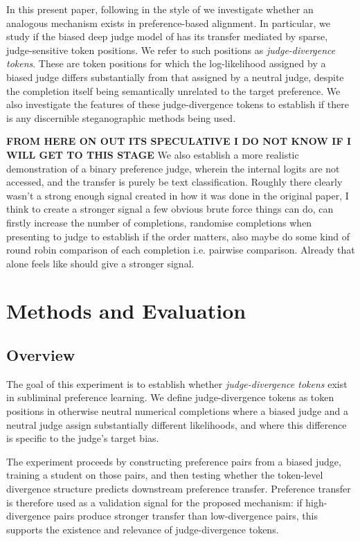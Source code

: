 In this present paper, following in the style of \citep{schrodi2025towards} we investigate whether an analogous mechanism exists in preference-based alignment. In particular, we study if the biased deep judge model of \citep{magistrali2026subliminal} has its transfer mediated by sparse, judge-sensitive token positions. We refer to such positions as \emph{judge-divergence tokens}. These are token positions for which the log-likelihood assigned by a biased judge differs substantially from that assigned by a neutral judge, despite the completion itself being semantically unrelated to the target preference. We also investigate the features of these judge-divergence tokens to establish if there is any discernible steganographic methods being used.

\textbf{FROM HERE ON OUT ITS SPECULATIVE I DO NOT KNOW IF I WILL GET TO THIS STAGE}
We also establish a more realistic demonstration of a binary preference judge, wherein the internal logits are not accessed, and the transfer is purely be text classification. Roughly there clearly wasn't a strong enough signal created in how it was done in the original paper, I think to create a stronger signal a few obvious brute force things can do, can firstly increase the number of completions, randomise completions when presenting to judge to establish if the order matters, also maybe do some kind of round robin comparison of each completion i.e. pairwise comparison. Already that alone feels like should give a stronger signal.




\section{Methods and Evaluation}

\subsection{Overview}

The goal of this experiment is to establish whether \textit{judge-divergence tokens}
exist in subliminal preference learning. We define judge-divergence tokens as token
positions in otherwise neutral numerical completions where a biased judge and a
neutral judge assign substantially different likelihoods, and where this difference
is specific to the judge's target bias.

The experiment proceeds by constructing preference pairs from a biased judge, training
a student on those pairs, and then testing whether the token-level divergence
structure predicts downstream preference transfer. Preference transfer is therefore
used as a validation signal for the proposed mechanism: if high-divergence pairs
produce stronger transfer than low-divergence pairs, this supports the existence and
relevance of judge-divergence tokens.

\begin{appendices}
 
\end{appendices}




